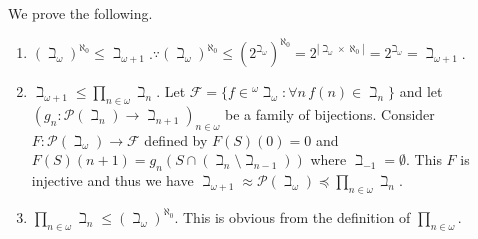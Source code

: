 \documentclass[12pt]{article}
\theoremstyle{definition}
\newenvironment{customthm}[1]
  {\renewcommand\theinnercustomthm{#1}\innercustomthm}
  {\endinnercustomthm}
\begin{document}
\begin{customthm}{I.13.33}
  We prove the following.
  \begin{enumerate}
    \item\underline{$(\beth_\omega)^{\aleph_0}\leq\beth_{\omega+1}$}.$\because(\beth_\omega)^{\aleph_0}\leq(2^{\beth_\omega})^{\aleph_0}=2^{|\beth_\omega\times\aleph_0|}=2^{\beth_\omega}=\beth_{\omega+1}$.
    \item\underline{$\beth_{\omega+1}\leq\prod_{n\in\omega}\beth_n$}. Let $\mathcal{F}=\{f\in{}^\omega\beth_\omega:\forall n\,f(n)\in\beth_n\}$ and let $(g_n:\mathcal{P}(\beth_n)\rightarrow\beth_{n+1})_{n\in\omega}$ be a family of bijections. Consider $F:\mathcal{P}(\beth_\omega)\rightarrow\mathcal{F}$ defined by $F(S)(0)=0$ and $F(S)(n+1)=g_n(S\cap(\beth_n\setminus\beth_{n-1}))$ where $\beth_{-1}=\emptyset$. This $F$ is injective and thus we have $\beth_{\omega+1}\approx\mathcal{P}(\beth_\omega)\preccurlyeq\prod_{n\in\omega}\beth_n$.
    \item\underline{$\prod_{n\in\omega}\beth_n\leq(\beth_\omega)^{\aleph_0}$}. This is obvious from the definition of $\prod_{n\in\omega}$.
  \end{enumerate}
\end{customthm}
\end{document}
